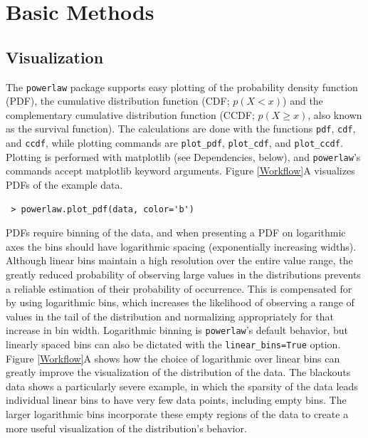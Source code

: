 \documentclass[10pt]{article}
\begin{document}
 \section*{Basic Methods}
 \subsection*{Visualization}
 The \verb$powerlaw$ package supports easy plotting of the probability density function (PDF), the cumulative distribution function (CDF; $p(X<x)$) and the complementary cumulative distribution function (CCDF; $p(X\geq x)$, also known as the survival function). The calculations are done with the functions \verb$pdf$, \verb$cdf$, and \verb$ccdf$, while plotting commands are \verb$plot_pdf$, \verb$plot_cdf$, and \verb$plot_ccdf$. Plotting is performed with matplotlib (see Dependencies, below), and \verb$powerlaw$'s commands accept matplotlib keyword arguments. Figure \ref{Workflow}A visualizes PDFs of the example data.
 
 \begin{verbatim}
 > powerlaw.plot_pdf(data, color='b')
 \end{verbatim}
 
 
PDFs require binning of the data, and when presenting a PDF on logarithmic axes the bins should have logarithmic spacing (exponentially increasing widths). Although linear bins maintain a high resolution over the entire value range, the greatly reduced probability of observing large values in the distributions prevents a reliable estimation of their probability of occurrence. This is compensated for by using logarithmic bins, which increases the likelihood of observing a range of values in the tail of the distribution and normalizing appropriately for that increase in bin width. Logarithmic binning is \verb$powerlaw$'s default behavior, but linearly spaced bins can also be dictated with the \verb"linear_bins=True" option. Figure \ref{Workflow}A shows how the choice of logarithmic over linear bins can greatly improve the visualization of the distribution of the data. The blackouts data shows a particularly severe example, in which the sparsity of the data leads individual linear bins to have very few data points, including empty bins. The larger logarithmic bins incorporate these empty regions of the data to create a more useful visualization of the distribution's behavior.
 
\end{document}
